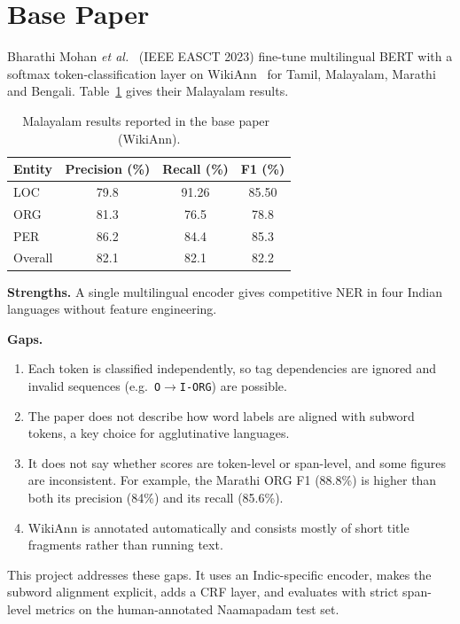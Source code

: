 \section{Base Paper}

Bharathi Mohan \emph{et al.}~\cite{mohan2023finetuned} (IEEE EASCT 2023)
fine-tune multilingual BERT with a softmax token-classification layer on
WikiAnn~\cite{pan2017cross} for Tamil, Malayalam, Marathi and Bengali.
Table~\ref{tab:base} gives their Malayalam results.

\begin{table}[H]
\centering
\caption{Malayalam results reported in the base paper~\cite{mohan2023finetuned} (WikiAnn).}
\label{tab:base}
\begin{tabular}{lccc}
\toprule
Entity & Precision (\%) & Recall (\%) & F1 (\%) \\
\midrule
LOC     & 79.8 & 91.26 & 85.50 \\
ORG     & 81.3 & 76.5  & 78.8  \\
PER     & 86.2 & 84.4  & 85.3  \\
Overall & 82.1 & 82.1  & 82.2  \\
\bottomrule
\end{tabular}
\end{table}

\textbf{Strengths.} A single multilingual encoder gives competitive NER in
four Indian languages without feature engineering.

\textbf{Gaps.}
\begin{enumerate}
  \item Each token is classified independently, so tag dependencies are
  ignored and invalid sequences (e.g.\ \texttt{O}$\rightarrow$\texttt{I-ORG})
  are possible.
  \item The paper does not describe how word labels are aligned with subword
  tokens, a key choice for agglutinative languages.
  \item It does not say whether scores are token-level or span-level, and
  some figures are inconsistent. For example, the Marathi ORG F1 (88.8\%)
  is higher than both its precision (84\%) and its recall (85.6\%).
  \item WikiAnn is annotated automatically and consists mostly of short
  title fragments rather than running text.
\end{enumerate}

This project addresses these gaps. It uses an Indic-specific encoder, makes
the subword alignment explicit, adds a CRF layer, and evaluates with strict
span-level metrics on the human-annotated Naamapadam test set.
